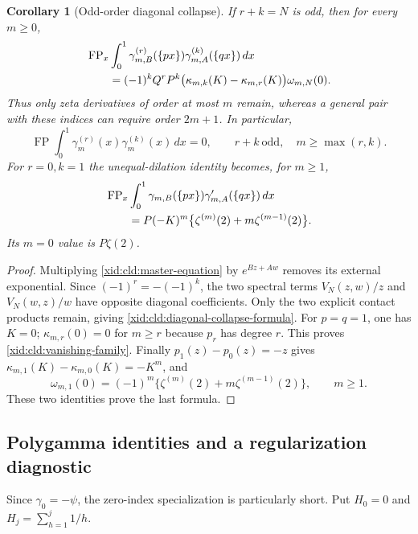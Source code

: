 \documentclass[11pt,a4paper]{article}
\numberwithin{equation}{section}
\newtheorem{corollary}[theorem]{Corollary}
\theoremstyle{definition}
\theoremstyle{remark}
\begin{document}
\begin{corollary}[Odd-order diagonal collapse]
\label{xid:cld:diagonal-collapse}
If $r+k=N$ is odd, then for every $m\ge0$,
\begin{align}
 &\operatorname{FP}_x\int_0^1
   \gamma_{m,B}^{(r)}(\{px\})\gamma_{m,A}^{(k)}(\{qx\})\,dx\notag\\
 &\qquad=(-1)^kQ^rP^k
       \bigl(\kappa_{m,k}(K)-\kappa_{m,r}(K)\bigr)\omega_{m,N}(0).
 \label{xid:cld:diagonal-collapse-formula}
\end{align}
Thus only zeta derivatives of order at most $m$ remain, whereas a general
pair with these indices can require order $2m+1$.  In particular,
\begin{equation}
 \operatorname{FP}\int_0^1\gamma_m^{(r)}(x)\gamma_m^{(k)}(x)\,dx=0,
 \qquad r+k\ \text{odd},\quad m\ge\max(r,k).
 \label{xid:cld:vanishing-family}
\end{equation}
For $r=0,k=1$ the unequal-dilation identity becomes, for $m\ge1$,
\begin{align}
 &\operatorname{FP}_x\int_0^1
   \gamma_{m,B}(\{px\})\gamma_{m,A}'(\{qx\})\,dx\notag\\
 &\qquad=P(-K)^m\bigl\{\zeta^{(m)}(2)+m\zeta^{(m-1)}(2)\bigr\}.
 \label{xid:cld:diagonal-first-derivative}
\end{align}
Its $m=0$ value is $P\zeta(2)$.
\end{corollary}
\begin{proof}
Multiplying \eqref{xid:cld:master-equation} by $e^{Bz+Aw}$ removes its
external exponential.  Since $(-1)^r=-(-1)^k$, the two spectral terms
$V_N(z,w)/z$ and $V_N(w,z)/w$ have opposite diagonal coefficients.
Only the two explicit contact products remain, giving
\eqref{xid:cld:diagonal-collapse-formula}.  For $p=q=1$, one has $K=0$;
$\kappa_{m,r}(0)=0$ for $m\ge r$ because $p_r$ has degree $r$.
This proves \eqref{xid:cld:vanishing-family}.  Finally $p_1(z)-p_0(z)=-z$
gives $\kappa_{m,1}(K)-\kappa_{m,0}(K)=-K^m$, and
\[
 \omega_{m,1}(0)=(-1)^m
      \{\zeta^{(m)}(2)+m\zeta^{(m-1)}(2)\},\qquad m\ge1.
\]
These two identities prove the last formula.
\end{proof}

\subsection{Polygamma identities and a regularization diagnostic}

Since $\gamma_0=-\psi$, the zero-index specialization is particularly
short.  Put $H_0=0$ and $H_j=\sum_{h=1}^j1/h$.
\end{document}
